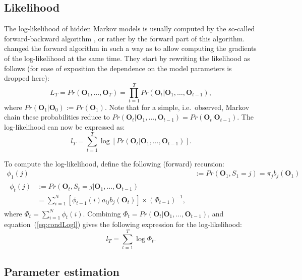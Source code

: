 \documentclass[article]{jss}
\newcommand{\vc}{\mathbf}
\begin{document}
\subsection{Likelihood}

The log-likelihood of hidden Markov models is usually computed by the
so-called forward-backward algorithm \citep{Baum1966,Rabiner1989}, or
rather by the forward part of this algorithm.  \cite{Lystig2002}
changed the forward algorithm in such a way as to allow computing the
gradients of the log-likelihood at the same time.  They start by
rewriting the likelihood as follows (for ease of exposition the
dependence on the model parameters is dropped here):
\begin{equation}
	L_{T} = Pr(\vc{O}_{1}, \ldots, \vc{O}_{T}) = \prod_{t=1}^{T} 
Pr(\vc{O}_{t}|\vc{O}_{1}, 
	\ldots, \vc{O}_{t-1}), 
	\label{condLike}
\end{equation}
where $Pr(\vc{O}_{1}|\vc{O}_{0}):=Pr(\vc{O}_{1})$. Note that for a 
simple, i.e.\ observed, Markov chain these probabilities reduce to 
$Pr(\vc{O}_{t}|\vc{O}_{1},\ldots, 
\vc{O}_{t-1})=Pr(\vc{O}_{t}|\vc{O}_{t-1})$.
The log-likelihood can now be expressed as:
\begin{equation}
	l_{T} = \sum_{t=1}^{T} \log[Pr(\vc{O}_{t}|\vc{O}_{1}, \ldots, 
\vc{O}_{t-1})].
	\label{eq:condLogl}
\end{equation}

To compute the log-likelihood, \cite{Lystig2002} define the following 
(forward) recursion:
\begin{align}
	\phi_{1}(j) &:= Pr(\vc{O}_{1}, S_{1}=j) = \pi_{j} b_{j}(\vc{O}_{1}) 
	\label{eq:fwd1} \\
\begin{split}
	\phi_{t}(j) &:= Pr(\vc{O}_{t}, S_{t}=j|\vc{O}_{1}, \ldots, 
\vc{O}_{t-1}) \\
	&= \sum_{i=1}^{N} [\phi_{t-1}(i)a_{ij}b_{j}(\vc{O}_{t})] \times 
(\Phi_{t-1})^{-1},
	\label{eq:fwdt} 
\end{split} 
\end{align}
where $\Phi_{t}=\sum_{i=1}^{N} \phi_{t}(i)$. Combining 
$\Phi_{t}=Pr(\vc{O}_{t}|\vc{O}_{1}, \ldots, \vc{O}_{t-1})$, and 
equation~(\ref{eq:condLogl}) gives the following expression for the 
log-likelihood:
\begin{equation}
	l_{T} = \sum_{t=1}^{T} \log \Phi_{t}.
	\label{eq:logl}
\end{equation}


\subsection{Parameter estimation}
\end{document}
